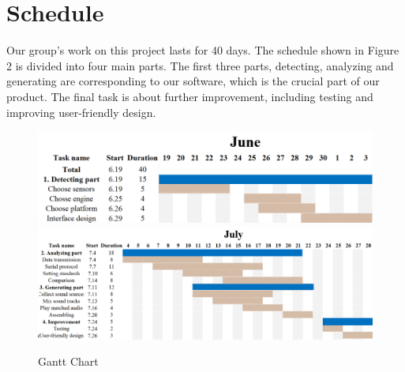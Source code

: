 \section{Schedule}
Our group's work on this project lasts for 40 days. The schedule shown in Figure 2 is divided into four main parts. The first three parts, detecting, analyzing and generating are corresponding to our software, which is the crucial part of our product. The final task is about further improvement, including testing and improving user-friendly design.
\begin{figure}[H]
    \includegraphics[width=11.5cm]{Pics/Gantt}
    \includegraphics[width=16cm]{Pics/Gantt1}
    \caption{Gantt Chart}
    \label{scalerStep}
\end{figure}
